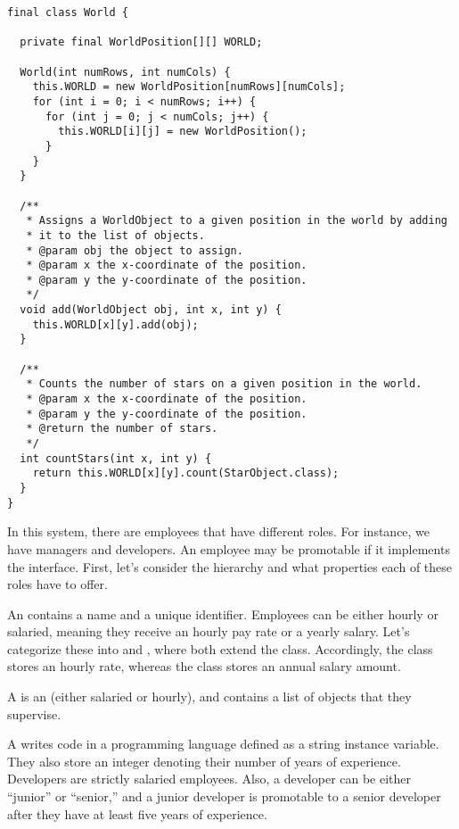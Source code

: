 \enlargethispage{-3\baselineskip}
\begin{lstlisting}[language=MyJava]
final class World {
  
  private final WorldPosition[][] WORLD;

  World(int numRows, int numCols) {
    this.WORLD = new WorldPosition[numRows][numCols];
    for (int i = 0; i < numRows; i++) {
      for (int j = 0; j < numCols; j++) {
        this.WORLD[i][j] = new WorldPosition();
      }
    }
  }

  /**
   * Assigns a WorldObject to a given position in the world by adding
   * it to the list of objects.
   * @param obj the object to assign.
   * @param x the x-coordinate of the position.
   * @param y the y-coordinate of the position.
   */
  void add(WorldObject obj, int x, int y) {
    this.WORLD[x][y].add(obj);
  }

  /**
   * Counts the number of stars on a given position in the world.
   * @param x the x-coordinate of the position.
   * @param y the y-coordinate of the position.
   * @return the number of stars.
   */
  int countStars(int x, int y) {
    return this.WORLD[x][y].count(StarObject.class);
  }
}
\end{lstlisting}

In this system, there are employees that have different roles. 
For instance, we have managers and developers. 
An employee may be promotable if it implements the  interface. 
First, let's consider the hierarchy and what properties each of these roles have to offer.

An  contains a name and a unique identifier. 
Employees can be either hourly or salaried, meaning they receive an hourly pay rate or a yearly salary. 
Let's categorize these into  and , where both extend the  class. 
Accordingly, the  class stores an hourly rate, whereas the  class stores an annual salary amount.

A  is an  (either salaried or hourly), and contains a list of  objects that they supervise. 

A  writes code in a programming language defined as a string instance variable. 
They also store an integer denoting their number of years of experience. 
Developers are strictly salaried employees. 
Also, a developer can be either ``junior'' or ``senior,'' and a junior developer is promotable to a senior developer after they have at least five years of experience.

